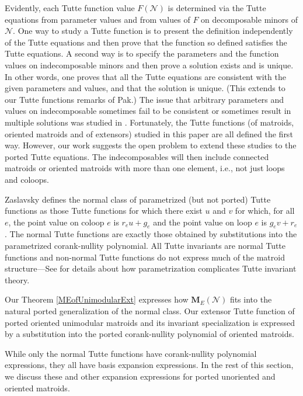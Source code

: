 \documentclass[12pt]{article}
\theoremstyle{definition}
\newcommand{\ext}[1]{\ensuremath{\mathbf{#1}}}
\begin{document}
Evidently, each Tutte function value $F(\mathcal{N})$
is determined via the Tutte
equations from parameter values and from values of $F$ on 
decomposable minors of $\mathcal{N}$.  One way to 
study a Tutte function is to present the definition independently 
of the Tutte equations and then prove that the function so 
defined satisfies the Tutte equations.  A second way is to
specify the parameters and the function values on indecomposable minors and
then prove a solution exists and is unique.  In other words, one
proves that all the Tutte equations are consistent with the given 
parameters and values, and that the solution is unique.  
(This extends to our Tutte functions remarks of Pak\cite{Pak}.)
The issue 
that arbitrary parameters and values on indecomposable sometimes
fail to be consistent or sometimes result in multiple solutions was studied
in \cite{MR93a:05047,BollobasRiordanTuttePolyColored,Ellis-Monaghan-Traldi}.
Fortunately, 
the Tutte functions (of matroids, oriented matroids and of extensors)
studied in this paper are all defined the first way.  However,
our work suggests the open problem to extend these studies to the ported
Tutte equations.  The indecomposables will then include connected matroids or 
oriented matroids with more than one element, i.e., not just
loops and coloops.

Zaslavsky\cite{MR93a:05047}
defines the normal class of parametrized (but not ported) Tutte
functions as those Tutte functions for which there exist 
$u$ and $v$ for which, for all $e$,
the point value on coloop $e$ is $r_eu + g_e$ 
and the point value
on loop $e$ is $g_ev + r_e$.  The normal Tutte functions 
are exactly those obtained by substitutions into the parametrized corank-nullity
polynomial.  All Tutte invariants are normal Tutte functions
and non-normal Tutte functions do not express much of
the matroid structure---See 
\cite{MR93a:05047,BollobasRiordanTuttePolyColored,Ellis-Monaghan-Traldi}
for details about how parametrization complicates Tutte invariant
theory.  

Our Theorem \ref{MEofUnimodularExt} expresses how
$\ext{M}_E(\mathcal{N})$ 
fits into the natural ported generalization of the
normal class.  Our extensor Tutte function of ported oriented 
unimodular matroids and its invariant specialization is expressed
by a substitution into the ported corank-nullity polynomial of
oriented matroids.

While only the normal Tutte functions have corank-nullity
polynomial expressions, they all have 
basis expansion expressions\cite{MR93a:05047}.
In the rest of this section, we discuss these and other
expansion expressions for ported unoriented and oriented matroids.
\end{document}
